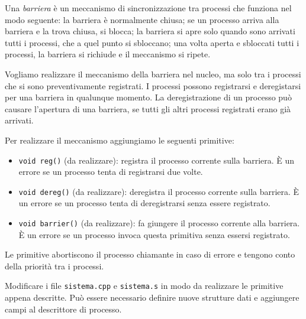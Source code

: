 Una {\em barriera} \`e un meccanismo di sincronizzazione tra processi che funziona nel modo seguente:
la barriera \`e normalmente chiusa; se un processo arriva alla barriera e la trova chiusa, si blocca;
la barriera si apre solo quando sono arrivati tutti i processi, che a quel punto si sbloccano;
una volta aperta e sbloccati tutti i processi, la barriera si richiude e il meccanismo si ripete.

Vogliamo realizzare il meccanismo della barriera nel nucleo, ma solo tra i processi che si sono
preventivamente registrati. I processi possono registrarsi e deregistarsi per una barriera in qualunque momento.
La deregistrazione di un processo pu\`o causare l'apertura di una barriera, se tutti gli altri processi
registrati erano gi\`a arrivati.

Per realizzare il meccanismo aggiungiamo le seguenti primitive:
\begin{itemize}
   \item \verb|void reg()| (da realizzare):
	registra il processo corrente sulla barriera. \`E un errore se un processo
	tenta di registrarsi due volte.
   \item \verb|void dereg()| (da realizzare):
	deregistra il processo corrente sulla barriera. \`E un errore se un processo
	tenta di deregistrarsi senza essere registrato.
   \item \verb|void barrier()| (da realizzare): fa giungere il processo corrente 
	alla barriera.  \`E un errore se un processo invoca questa primitiva senza essersi registrato.
\end{itemize}

Le primitive abortiscono il processo chiamante in caso di errore e tengono conto della priorit\`a tra i processi.

Modificare i file \verb|sistema.cpp| e \verb|sistema.s| in modo da realizzare le primitive appena descritte.
Pu\`o essere necessario definire nuove strutture dati e aggiungere campi al descrittore di processo.
